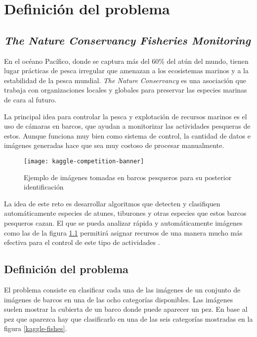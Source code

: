 
\chapter{Definición del problema}

\label{Chapter5} %

\section{\textit{The Nature Conservancy Fisheries Monitoring }}

En el océano Pacífico, donde se captura más del 60\% del atún del mundo, tienen
lugar prácticas de pesca irregular que amenazan a los ecosistemas marinos y a
la estabilidad de la pesca mundial. \textit{The Nature Conservancy} es una
asociación que trabaja con organizaciones locales y globales para preservar las
especies marinas de cara al futuro.

La principal idea para controlar la pesca y explotación de recursos marinos es
el uso de cámaras en barcos, que ayudan a monitorizar las actividades pesqueras
de estos. Aunque funciona muy bien como sistema de control, la cantidad de
datos e imágenes generadas hace que sea muy costoso de procesar manualmente.

\begin{figure}
  \centering
  \caption{Ejemplo de imágenes tomadas en barcos pesqueros para su posterior identificación}
\label{kaggle-banner}
  \texttt{[image: kaggle-competition-banner]}
\end{figure}

La idea de este reto es desarrollar algoritmos que detecten y clasifiquen
automáticamente especies de atunes, tiburones y otras especies que estos barcos
pesqueros cazan. El que se pueda analizar rápida y automáticamente imágenes
como las de la figura \ref{kaggle-banner} permitirá asignar recursos de una
manera mucho más efectiva para el control de este tipo de actividades
\parencite{kaggle-page}.

\section{Definición del problema}

El problema consiste en clasificar cada una de las imágenes de un conjunto de
imágenes de barcos en una de las ocho categorías disponibles. Las imágenes
suelen mostrar la cubierta de un barco donde puede aparecer un pez. En base al
pez que aparezca hay que clasificarlo en una de las seis categorías mostradas
en la figura \ref{kaggle-fishes}.

